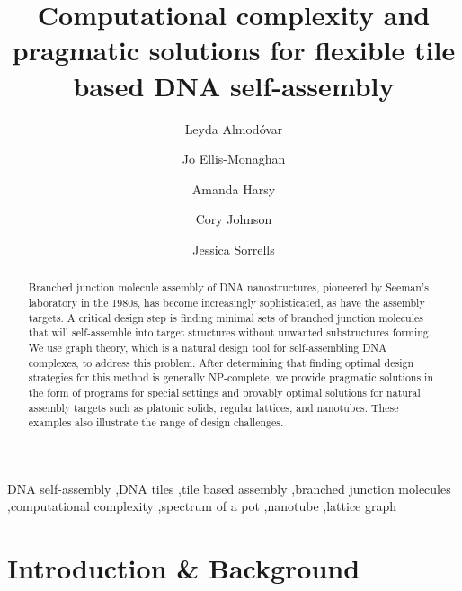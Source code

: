 \documentclass{elsarticle}
\theoremstyle{definition}
\theoremstyle{remark}
\theoremstyle{plain}
\theoremstyle{plain}
\begin{document}
\begin{frontmatter}

\title{Computational complexity and pragmatic solutions for flexible tile based DNA self-assembly}

\author[label1]{Leyda Almod\'ovar}
\address[label1]{Stonehill College, Easton, MA}

\author[label2]{Jo Ellis-Monaghan}
\address[label2]{University of Amsterdam, the Netherlands}

\author[label3]{Amanda Harsy}
\address[label3]{Lewis University, Romeoville, IL}

\author[label4]{Cory Johnson}
\address[label4]{California State University, San Bernardino, San Bernardino, CA}

\author[label5]{Jessica Sorrells}
\address[label5]{Converse University, Spartanburg, SC}


\begin{abstract}
 Branched junction molecule assembly of DNA nanostructures, pioneered by Seeman's laboratory in the 1980s, has become increasingly sophisticated, as have the assembly targets. A critical design step is finding minimal sets of branched junction molecules that will self-assemble into target structures without unwanted substructures forming.  We use graph theory, which is a  natural design tool for self-assembling DNA complexes, to address 
 this problem. After determining that finding optimal design strategies for this method is generally NP-complete, we provide pragmatic solutions in the form of programs for special settings and provably optimal solutions for natural assembly targets such as platonic solids, regular lattices, and nanotubes. These examples also illustrate the range of design challenges.  
\end{abstract}

\begin{keyword}
DNA self-assembly \sep DNA tiles  \sep tile based assembly \sep branched junction molecules \sep computational complexity \sep spectrum of a pot \sep nanotube \sep lattice graph
\end{keyword}

\end{frontmatter}

\newpage


\section{Introduction \& Background}  
\end{document}
